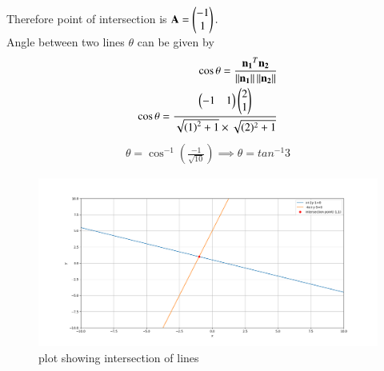 Therefore point of intersection is $\mathbf{A}=\begin{pmatrix}-1\\1\end{pmatrix}.$
\\
Angle between two lines $\theta$ can be given by
\begin{align}
\cos\theta =\frac{\mathbf{n_1}^T\mathbf{n_2}}{\left\lVert\mathbf{n_1}\right\rVert\left\lVert\mathbf{n_2}\right\rVert}\\
 \cos\theta=\frac{\begin{pmatrix}-1&1\end{pmatrix}\begin{pmatrix}2\\1\end{pmatrix}}{\sqrt{\left(1\right)^2 +1} \times \sqrt{(2)^2 +1}}
\end{align}
\begin{align}
\theta = \cos^{-1}(\frac{-1}{\sqrt{10}})\implies \theta = tan^{-1}3
\end{align}
\begin{figure}[!ht]
\centering
\includegraphics[width=\columnwidth]{./solutions/13/4/Figure_2.png}
\caption{plot showing intersection of lines}
\label{Fig:solutions/13/4}
\end{figure}
